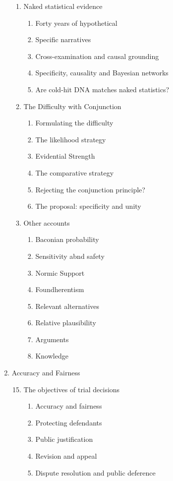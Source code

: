 \documentclass[
  10pt,
  dvipsnames,enabledeprecatedfontcommands]{scrartcl}
\begin{document}
\begin{multicols}{2}
\begin{enumerate}
\begin{enumerate}
\item  Naked statistical evidence
  \begin{enumerate}
  \item  Forty years of hypothetical
  \item  Specific narratives
  \item  Cross-examination and causal grounding
  \item  Specificity, causality and Bayesian networks 
  \item  Are cold-hit DNA matches naked statistics?
  \end{enumerate}
  
  
\item  The Difficulty with Conjunction
  \begin{enumerate}
  \item  Formulating the difficulty

  \item  The likelihood strategy
  \item  Evidential Strength
  \item  The comparative strategy
  \item  Rejecting the conjunction principle?
  \item  The proposal: specificity and unity 
  \end{enumerate}  

 \item  Other accounts 
  \begin{enumerate}
  \item  Baconian probability
  \item  Sensitivity abnd safety
  \item  Normic Support
  \item  Foundherentism
  \item  Relevant alternatives
  \item  Relative plausibility
  \item  Arguments
  \item  Knowledge
  \end{enumerate}

\end{enumerate}
\item  Accuracy and Fairness
\begin{enumerate}

\setcounter{enumii}{14}
  \item  The objectives of trial decisions
  \begin{enumerate}
  \item  Accuracy and fairness 
  \item  Protecting defendants
  \item  Public justification 
  \item  Revision and appeal
  \item  Dispute resolution and public deference
  \end{enumerate}





\end{enumerate}
\end{enumerate}
\end{multicols}
\end{document}
